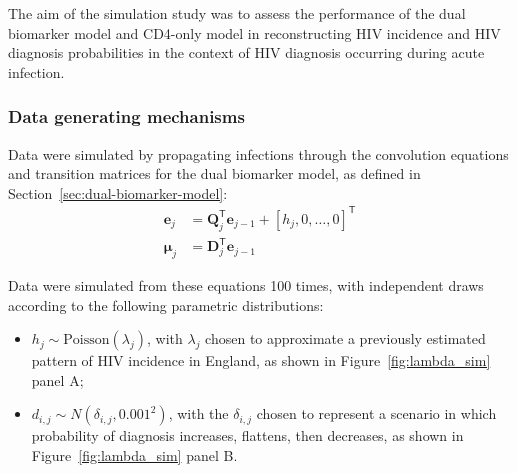 The aim of the simulation study was to assess the performance of the dual biomarker model and CD4-only model in reconstructing HIV incidence and HIV diagnosis probabilities in the context of HIV diagnosis occurring during acute infection.

\subsubsection{Data generating mechanisms}

Data were simulated by propagating infections through the convolution equations and transition matrices for the dual biomarker model, as defined in Section~\ref{sec:dual-biomarker-model}:
%
\begin{align*}
  \bm{e}_j   & = \mathbf{Q}_j^\mathsf{T} \bm{e}_{j-1} + {[h_j, 0, \ldots,0]}^\mathsf{T} \\
  \bm{\mu}_j & = \mathbf{D}_j^\mathsf{T} \bm{e}_{j-1}
\end{align*}

Data were simulated from these equations 100 times, with independent draws according to the following parametric distributions:
%
\begin{itemize}
  \item $h_j \sim \text{Poisson}(\lambda_{j})$, with $\lambda_{j}$ chosen to approximate a previously estimated pattern of HIV incidence in England, as shown in Figure~\ref{fig:lambda_sim} panel A\@;
  \item $d_{i,j} \sim N(\delta_{i,j}, 0.001^2)$, with the $\delta_{i,j}$ chosen to represent a scenario in which probability of diagnosis increases, flattens, then decreases, as shown in Figure~\ref{fig:lambda_sim} panel B\@.
\end{itemize}

